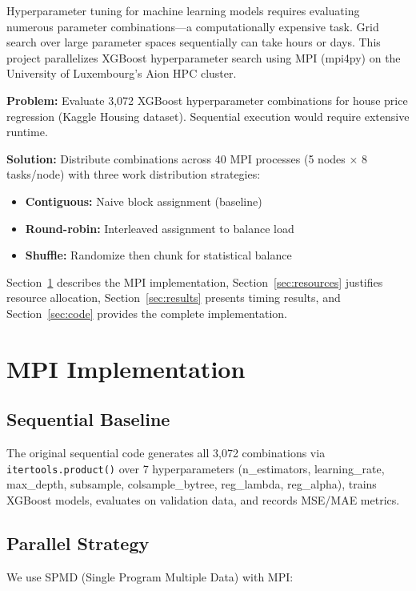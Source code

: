 \documentclass[sigplan,screen]{acmart}
\begin{document}
Hyperparameter tuning for machine learning models requires evaluating
numerous parameter combinations—a computationally expensive task. Grid
search over large parameter spaces sequentially can take hours or days.
This project parallelizes XGBoost hyperparameter search using MPI
(mpi4py) on the University of Luxembourg's Aion HPC cluster.

\textbf{Problem:} Evaluate 3,072 XGBoost hyperparameter combinations for
house price regression (Kaggle Housing dataset). Sequential execution
would require extensive runtime.

\textbf{Solution:} Distribute combinations across 40 MPI processes (5
nodes × 8 tasks/node) with three work distribution strategies:

\begin{itemize}
\item \textbf{Contiguous:} Naive block assignment (baseline)
\item \textbf{Round-robin:} Interleaved assignment to balance load
\item \textbf{Shuffle:} Randomize then chunk for statistical balance
\end{itemize}

Section~\ref{sec:implementation} describes the MPI implementation,
Section~\ref{sec:resources} justifies resource allocation,
Section~\ref{sec:results} presents timing results, and
Section~\ref{sec:code} provides the complete implementation.

\section{MPI Implementation}
\label{sec:implementation}

\subsection{Sequential Baseline}

The original sequential code generates all 3,072 combinations via
\texttt{itertools.product()} over 7 hyperparameters (n\_estimators,
learning\_rate, max\_depth, subsample, colsample\_bytree, reg\_lambda,
reg\_alpha), trains XGBoost models, evaluates on validation data, and
records MSE/MAE metrics.

\subsection{Parallel Strategy}

We use SPMD (Single Program Multiple Data) with MPI:
\end{document}
